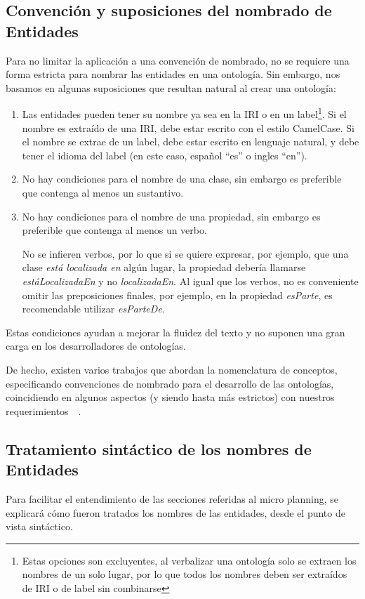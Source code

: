 \subsection{Convención y suposiciones del nombrado de Entidades}
Para no limitar la aplicación a una convención de nombrado, no se requiere una forma estricta para nombrar las entidades en una ontología. Sin embargo, nos basamos en algunas suposiciones que resultan natural al crear una ontología:
\begin{enumerate}
    \item Las entidades pueden tener su nombre ya sea en la IRI o en un label\footnote{Estas opciones son excluyentes, al verbalizar una ontología solo se extraen los nombres de un solo lugar, por lo que todos los nombres deben ser extraídos de IRI o de label sin combinarse}. Si el nombre es extraído de una IRI, debe estar escrito con el estilo CamelCase. Si el nombre se extrae de un label, debe estar escrito en lenguaje natural, y debe tener el idioma del label (en este caso, español ``es'' o ingles ``en'').
    \item No hay condiciones para el nombre de una clase, sin embargo es preferible que contenga al menos un sustantivo.
    \item No hay condiciones para el nombre de una propiedad, sin embargo es preferible que contenga al menos un verbo. 
    
    No se infieren verbos, por lo que si se quiere expresar, por ejemplo, que una clase \emph{está localizada en} algún lugar, la propiedad debería llamarse \emph{estáLocalizadaEn} y no \emph{localizadaEn}. Al igual que los verbos, no es conveniente omitir las preposiciones finales, por ejemplo, en la propiedad \emph{esParte}, es recomendable utilizar \emph{esParteDe}.
\end{enumerate}

Estas condiciones ayudan a mejorar la fluidez del texto y no suponen una gran carga en los desarrolladores de ontologías.

De hecho, existen varios trabajos que abordan la nomenclatura de conceptos, especificando convenciones de nombrado para el desarrollo de las ontologías, coincidiendo en algunos aspectos (y siendo hasta más estrictos) con nuestros requerimientos~\cite{montiel2011style}~\cite{OntoCheck}.

\subsection{Tratamiento sintáctico de los nombres de Entidades}
Para facilitar el entendimiento de las secciones referidas al micro planning, se explicará cómo fueron tratados los nombres de las entidades, desde el punto de vista sintáctico. 

